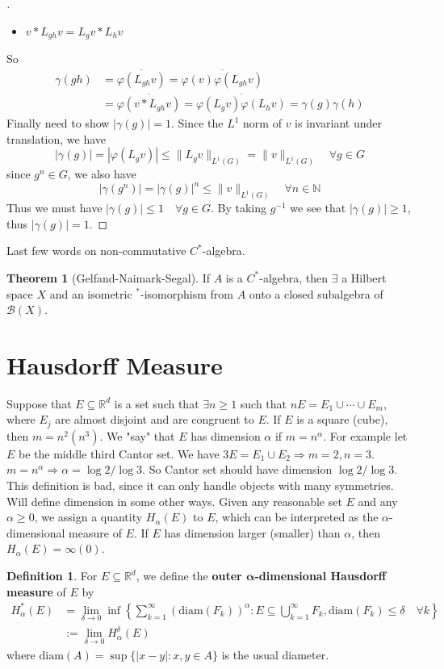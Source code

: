 \documentclass{article}
\theoremstyle{definition}
\newtheorem{thm}{Theorem}
\newtheorem{dfn}{Definition}
\newenvironment{proofs}[1][\proofname]{%
  \begin{proof}[#1]$ $\par\nobreak\ignorespaces
}{%
  \end{proof}
}
\newcommand{\B}{\mathcal B}
\newcommand{\NN}{\mathbb N}
\newcommand{\RR}{\mathbb R}
\newcommand{\Ra}{\Rightarrow}
\begin{document}
\begin{proofs}
\begin{itemize}
		\item $v * L_{gh} v = L_g v * L_h v$
	\end{itemize}
	So 
	\[
		\begin{split}
			\gamma(g h) &= \overline{\varphi(L_{gh} v)} = \overline{\varphi(v) \varphi(L_{gh} v)}\\
			&= \overline{\varphi(v * L_{gh} v)} = \overline{\varphi(L_g v) \varphi(L_h v)} = \gamma(g) \gamma(h)
		\end{split}
	\]
	Finally need to show $|\gamma(g)| = 1$.
	Since the $L^1$ norm of $v$ is invariant under translation, we have
	\[
		|\gamma(g)| = |\varphi(L_g v)| \leq \|L_g v\|_{L^1(G)} = \|v\|_{L^1(G)} \quad \forall g \in G
	\]
	since $g^n \in G$, we also have
	\[
		|\gamma(g^n)| = |\gamma(g)|^n \leq \|v\|_{L^1(G)} \quad \forall n \in \NN
	\]
	Thus we must have $|\gamma(g)| \leq 1 \quad \forall g \in G$.
	By taking $g^{-1}$ we see that $|\gamma(g)| \geq 1$, thus $|\gamma(g)| = 1$.
\end{proofs}

Last few words on non-commutative $C^*$-algebra.

\begin{thm}[Gelfand-Naimark-Segal]
	If $A$ is a $C^*$-algebra, then $\exists$ a Hilbert space $X$ and an isometric $^*$-isomorphism from $A$ onto a closed subalgebra of $\B(X)$.
\end{thm}

\section{Hausdorff Measure}

Suppose that $E \subseteq \RR^d$ is a set such that $\exists n \geq 1$ such that $nE = E_1 \cup \cdots \cup E_m$, where $E_j$ are almost disjoint and are congruent to $E$.
If $E$ is a square (cube), then $m = n^2 (n^3)$.
We "say" that $E$ has dimension $\alpha$ if $m = n^\alpha$.
For example let $E$ be the middle third Cantor set.
We have $3E = E_1 \cup E_2 \Ra m = 2, n = 3$.
$m = n^\alpha \Ra \alpha = \log 2/\log 3$.
So Cantor set should have dimension $\log 2/\log 3$.
This definition is bad, since it can only handle objects with many symmetries.
Will define dimension in some other ways.
Given any reasonable set $E$ and any $\alpha \geq 0$, we assign a quantity $H_\alpha(E)$ to $E$, which can be interpreted as the $\alpha$-dimensional measure of $E$.
If $E$ has dimension larger (smaller) than $\alpha$, then $H_\alpha(E) = \infty (0)$.

\begin{dfn}
	For $E \subseteq \RR^d$, we define the \textbf{outer $\bm{\alpha}$-dimensional Hausdorff measure} of $E$ by
	\[
		\begin{split}
			H_\alpha^*(E) &= \lim_{\delta \to 0} \inf \left\{ \sum_{k = 1}^\infty (\text{diam}(F_k))^\alpha: E \subseteq \bigcup_{k = 1}^\infty F_k, \text{diam}(F_k) \leq \delta \quad \forall k \right\}\\
			&:= \lim_{\delta \to 0} H_\alpha^\delta(E)
		\end{split}
	\]
	where $\text{diam}(A) = \sup \{|x - y|: x, y \in A\}$ is the usual diameter.
\end{dfn}
\end{document}

